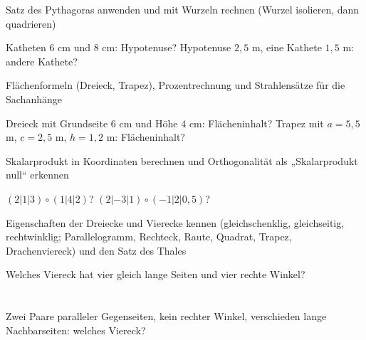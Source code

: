 \begin{aufgabe}{Satz des Pythagoras anwenden und mit Wurzeln rechnen (Wurzel isolieren, dann quadrieren)}
\begin{teile}
\teil Katheten $6$ cm und $8$ cm: Hypotenuse? \leerfeld[cm]
\teil Hypotenuse $2{,}5$ m, eine Kathete $1{,}5$ m: andere Kathete? \leerfeld[m]
\end{teile}
\end{aufgabe}

\begin{aufgabe}{Flächenformeln (Dreieck, Trapez), Prozentrechnung und Strahlensätze für die Sachanhänge}
\begin{teile}
\teil Dreieck mit Grundseite $6$ cm und Höhe $4$ cm: Flächeninhalt? \leerfeld[cm²]
\teil Trapez mit $a = 5{,}5$ m, $c = 2{,}5$ m, $h = 1{,}2$ m: Flächeninhalt? \leerfeld[m²]
\end{teile}
\end{aufgabe}

\begin{aufgabe}{Skalarprodukt in Koordinaten berechnen und Orthogonalität als „Skalarprodukt null“ erkennen}
\begin{teile}
\teil $(2 | 1 | 3) \circ (1 | 4 | 2)$? \leerfeld
\teil $(2 | -3 | 1) \circ (-1 | 2 | 0{,}5)$? \leerfeld
\end{teile}
\end{aufgabe}

\begin{aufgabe}{Eigenschaften der Dreiecke und Vierecke kennen (gleichschenklig, gleichseitig, rechtwinklig; Parallelogramm, Rechteck, Raute, Quadrat, Trapez, Drachenviereck) und den Satz des Thales}
\begin{teile}
\teil Welches Viereck hat vier gleich lange Seiten und vier rechte Winkel? \\  \\  \\ 
\teil Zwei Paare paralleler Gegenseiten, kein rechter Winkel, verschieden lange Nachbarseiten: welches Viereck? \\  \\  \\ 
\end{teile}
\end{aufgabe}

